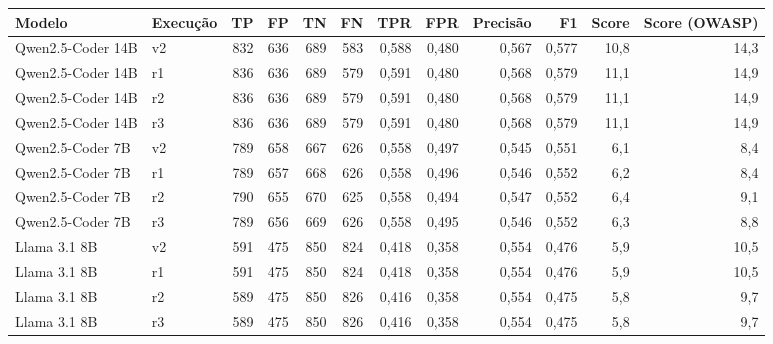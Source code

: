 \begin{tabular}{llrrrrrrrrrr}
\hline
Modelo & Execução & TP & FP & TN & FN & TPR & FPR & Precisão & F1 & Score & Score (OWASP) \\
\hline
Qwen2.5-Coder 14B & v2 & 832 & 636 & 689 & 583 & 0,588 & 0,480 & 0,567 & 0,577 & 10,8 & 14,3 \\
Qwen2.5-Coder 14B & r1 & 836 & 636 & 689 & 579 & 0,591 & 0,480 & 0,568 & 0,579 & 11,1 & 14,9 \\
Qwen2.5-Coder 14B & r2 & 836 & 636 & 689 & 579 & 0,591 & 0,480 & 0,568 & 0,579 & 11,1 & 14,9 \\
Qwen2.5-Coder 14B & r3 & 836 & 636 & 689 & 579 & 0,591 & 0,480 & 0,568 & 0,579 & 11,1 & 14,9 \\
Qwen2.5-Coder 7B & v2 & 789 & 658 & 667 & 626 & 0,558 & 0,497 & 0,545 & 0,551 & 6,1 & 8,4 \\
Qwen2.5-Coder 7B & r1 & 789 & 657 & 668 & 626 & 0,558 & 0,496 & 0,546 & 0,552 & 6,2 & 8,4 \\
Qwen2.5-Coder 7B & r2 & 790 & 655 & 670 & 625 & 0,558 & 0,494 & 0,547 & 0,552 & 6,4 & 9,1 \\
Qwen2.5-Coder 7B & r3 & 789 & 656 & 669 & 626 & 0,558 & 0,495 & 0,546 & 0,552 & 6,3 & 8,8 \\
Llama 3.1 8B & v2 & 591 & 475 & 850 & 824 & 0,418 & 0,358 & 0,554 & 0,476 & 5,9 & 10,5 \\
Llama 3.1 8B & r1 & 591 & 475 & 850 & 824 & 0,418 & 0,358 & 0,554 & 0,476 & 5,9 & 10,5 \\
Llama 3.1 8B & r2 & 589 & 475 & 850 & 826 & 0,416 & 0,358 & 0,554 & 0,475 & 5,8 & 9,7 \\
Llama 3.1 8B & r3 & 589 & 475 & 850 & 826 & 0,416 & 0,358 & 0,554 & 0,475 & 5,8 & 9,7 \\
\hline
\end{tabular}
